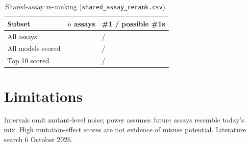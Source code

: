 \documentclass[9pt,twocolumn]{extarticle}
\begin{document}
\begin{table}[t]
\centering\scriptsize
\caption{Shared-assay re-ranking (\texttt{shared\_assay\_rerank.csv}).}
\label{tab:shared}
\setlength{\tabcolsep}{3pt}
\begin{tabular}{@{}lrl@{}}
\toprule
Subset & $n$ assays & \#1 / possible \#1s \\
\midrule
All assays & \nAssays{} & \topPublished{} / \bestSet{} \\
All models scored & \nCommonAssays{} & \topAllCommon{} / \bestSetAllCommon{} \\
Top 10 scored & \nTopTenCommonAssays{} & \topTopTenCommon{} / \bestSetTopTenCommon{} \\
\bottomrule
\end{tabular}
\end{table}

\section{Limitations}
Intervals omit mutant-level noise; power assumes future assays resemble today's mix. High mutation-effect scores are
not evidence of misuse potential. Literature search 6 October 2026.

{\footnotesize

}
\end{document}
